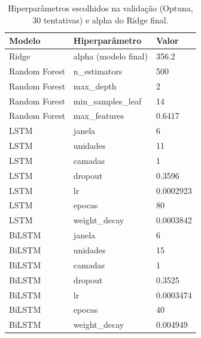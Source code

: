 \begin{table}
\caption{Hiperparâmetros escolhidos na validação (Optuna, 30 tentativas) e alpha do Ridge final.}
\label{tab:tab5_hiperparametros}
\begin{tabular}{lll}
\toprule
Modelo & Hiperparâmetro & Valor \\
\midrule
Ridge & alpha (modelo final) & 356.2 \\
Random Forest & n\_estimators & 500 \\
Random Forest & max\_depth & 2 \\
Random Forest & min\_samples\_leaf & 14 \\
Random Forest & max\_features & 0.6417 \\
LSTM & janela & 6 \\
LSTM & unidades & 11 \\
LSTM & camadas & 1 \\
LSTM & dropout & 0.3596 \\
LSTM & lr & 0.0002923 \\
LSTM & epocas & 80 \\
LSTM & weight\_decay & 0.0003842 \\
BiLSTM & janela & 6 \\
BiLSTM & unidades & 15 \\
BiLSTM & camadas & 1 \\
BiLSTM & dropout & 0.3525 \\
BiLSTM & lr & 0.0003474 \\
BiLSTM & epocas & 40 \\
BiLSTM & weight\_decay & 0.004949 \\
\bottomrule
\end{tabular}
\end{table}
